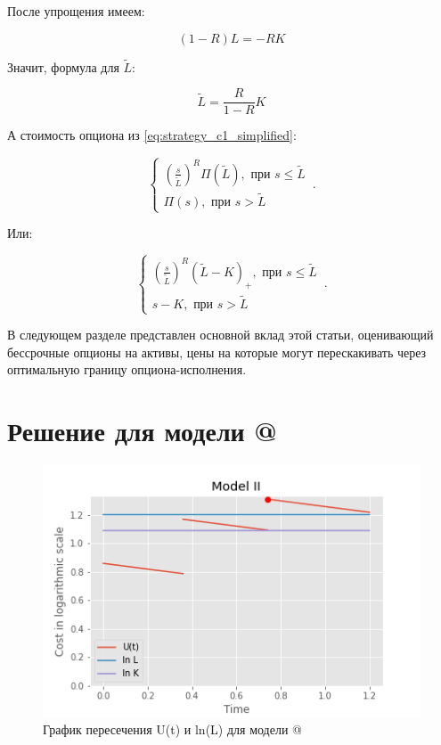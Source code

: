 \documentclass[a4paper,12pt]{article}
\makeatletter
\theoremstyle{definition}
\newcommand*{\rom}[1]{\expandafter\@slowromancap\romannumeral #1@}
\makeatother
\begin{document}
После упрощения имеем:

\begin{equation*}
    (1 - R) L = - R K
\end{equation*}

Значит, формула для $\tilde{L}$:

\begin{equation}\label{eq:first_order_rule_m1}
    \tilde{L} = \frac{R}{1 - R} K
\end{equation}

А стоимость опциона из \eqref{eq:strategy_c1_simplified}:

\begin{equation*}
    \begin{cases}
       \left(\frac{s}{\widetilde{L}}\right)^{R} \Pi(\widetilde{L}), \text{ при } s \le \widetilde{L}\\
      \Pi(s), \text{ при } s > \widetilde{L}
    \end{cases}\,.
\end{equation*}

Или:

\begin{equation}\label{eq:option_price_m1}
    \begin{cases}
       \left(\frac{s}{\widetilde{L}}\right)^{R} (\widetilde{L} - K)_{+}, \text{ при } s \le \widetilde{L}\\
      s - K, \text{ при } s > \widetilde{L}
    \end{cases}\,.
\end{equation}

В следующем разделе представлен основной вклад этой статьи, оценивающий бессрочные опционы на активы, цены на которые могут перескакивать через оптимальную границу опциона-исполнения.

\section{Решение для модели \rom{2}}


\begin{figure}[htbp]
\label{fig:model2tracklcrosslog}
\centerline{\includegraphics[scale=0.7]{img/model2_with_L_log.png}}
\caption{График пересечения U(t) и ln(L) для модели \rom{2}}
\end{figure}
\end{document}

